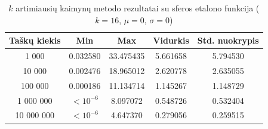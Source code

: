 \begin{table}[H]
    \centering
    \begin{tabular}{|c|c|c|c|c|}
        \hline
        \textbf{Taškų kiekis} & \textbf{Min} & \textbf{Max} & \textbf{Vidurkis} & \textbf{Std. nuokrypis} \\ \hline
        1 000        & 0.032580 & 33.475435 & 5.661658 & 5.794530 \\ \hline
        10 000       & 0.002476 & 18.965012 & 2.620778 & 2.635055 \\ \hline
        100 000      & 0.000186 & 11.134714 & 1.145267 & 1.148729 \\ \hline
        1 000 000    & $<10^{-6}$ & 8.097072 & 0.548726 & 0.532404 \\ \hline
        10 000 000   & $<10^{-6}$ & 4.647370 & 0.279056 & 0.259515 \\ \hline
    \end{tabular}
    \caption{$k$ artimiausių kaimynų metodo rezultatai su sferos etalono funkcija ($k = 16$, $\mu = 0$, $\sigma = 0$)}
\end{table}